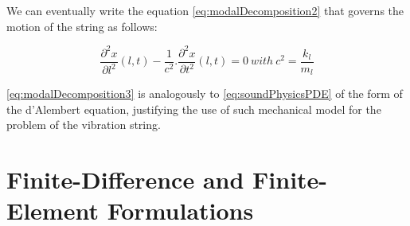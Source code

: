 We can eventually write the equation \myequname \eqref{eq:modalDecomposition2} that governs the motion of the string as follows:

\begin{equation}
	\frac{\partial^2{x}}{\partial{l^2}}(l, t) - \frac{1}{c^2} . \frac{\partial^2{x}}{\partial{t^2}}(l, t) = 0\ with\ c^2 = \frac{k_l}{m_l} \label{eq:modalDecomposition3}
\end{equation}

\myequname \eqref{eq:modalDecomposition3} is analogously to \myequname \eqref{eq:soundPhysicsPDE} of the form of the d'Alembert equation, justifying the use of such mechanical model for the problem of the vibration string.

\newpage\vfill


	\section{Finite-Difference and Finite-Element Formulations}
	\label{sec:ssDerivation:finiteDifferenceElement}

